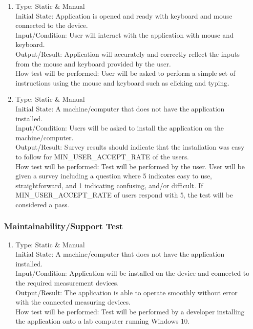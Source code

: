 \documentclass[12pt, titlepage]{article}
\begin{document}
\begin{adjustwidth}{2.2em}{0pt}
\begin{enumerate}[{NF-OT}1.]
    \item Type: Static \& Manual\\
    Initial State: Application is opened and ready with keyboard and mouse connected to the device.\\
    Input/Condition: User will interact with the application with mouse and keyboard.\\
    Output/Result: Application will accurately and correctly reflect the inputs from the mouse and keyboard provided by the user.\\
    How test will be performed: User will be asked to perform a simple set of instructions using the mouse and keyboard such as clicking and typing.
    
    \item Type: Static \& Manual\\
    Initial State: A machine/computer that does not have the application installed.\\
    Input/Condition: Users will be asked to install the application on the machine/computer.\\
    Output/Result: Survey results should indicate that the installation was easy to follow for MIN\_USER\_ACCEPT\_RATE of the users.\\
    How test will be performed: Test will be performed by the user. User will be given a survey including a question where 5 indicates easy to use, straightforward, and 1 indicating confusing, and/or difficult. If MIN\_USER\_ACCEPT\_RATE of users respond with 5, 
    the test will be considered a pass.
\end{enumerate}
\end{adjustwidth}

\subsubsection{Maintainability/Support Test}

\begin{adjustwidth}{2.2em}{0pt}
\begin{enumerate}[{NF-MT}1.]
    \item Type: Static \& Manual\\
    Initial State: A machine/computer that does not have the application installed.\\
    Input/Condition: Application will be installed on the device and connected to the required measurement devices.\\
    Output/Result: The application is able to operate smoothly without error with the connected measuring devices.\\
    How test will be performed: Test will be performed by a developer installing the application onto a lab computer running Windows 10.
\end{enumerate}
\end{adjustwidth}
\end{document}
